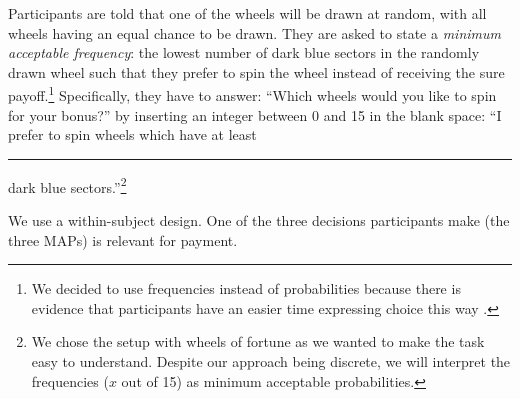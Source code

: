 \documentclass[12pt, a4paper]{article}
\begin{document}
Participants are told that one of the wheels will be drawn at random, with all wheels having an equal chance to be drawn.
They are asked to state a \textit{minimum acceptable frequency}: the lowest number of dark blue sectors in the randomly drawn wheel such that they prefer to spin the wheel instead of receiving the sure payoff.\footnote{
We decided to use frequencies instead of probabilities because there is evidence that participants have an easier time expressing choice this way \citep{Quercia2016}.}
Specifically, they have to answer: ``Which wheels would you like to spin for your bonus?'' by inserting an integer between 0 and 15 in the blank space: ``I prefer to spin wheels which have at least \rule{1cm}{0.15mm} dark blue sectors.''\footnote{
We chose the setup with wheels of fortune as we wanted to make the task easy to understand.
Despite our approach being discrete, we will interpret the frequencies ($x$ out of 15) as minimum acceptable probabilities.
}

We use a within-subject design.
One of the three decisions participants make (the three MAPs) is relevant for payment.

\clearpage
\pagebreak


\end{document}
